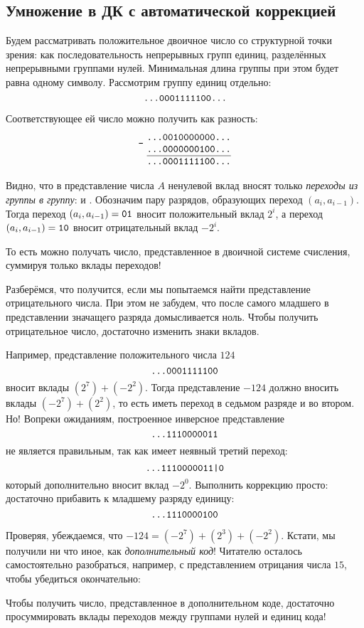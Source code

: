 \subsection{Умножение в ДК с автоматической коррекцией} 

Будем рассматривать положительное двоичное число со структурной точки зрения: как последовательность непрерывных групп единиц, разделённых непрерывными группами нулей. Минимальная длина группы при этом будет равна одному символу. Рассмотрим группу единиц отдельно:
\[
    \texttt{...0001111100...}
\]

Соответствующее ей число можно получить как разность:
\[
    \Subtraction{...0010000000...}
                {...0000000100...}
                {...0001111100...}
\]

Видно, что в представление числа $A$ ненулевой вклад вносят только \emph{переходы из группы в группу}:  и . Обозначим пару разрядов, образующих переход $(a_i,a_{i-1})$. Тогда переход $(a_i,a_{i-1})=\texttt{01}$ вносит положительный вклад $2^i$, а переход $(a_i,a_{i-1})=\texttt{10}$ вносит отрицательный вклад ${-2^i}$.

То есть можно получать число, представленное в двоичной системе счисления, суммируя только вклады переходов!

Разберёмся, что получится, если мы попытаемся найти представление отрицательного числа. При этом не забудем, что после самого младшего в представлении значащего разряда домысливается ноль. Чтобы получить отрицательное число, достаточно изменить знаки вкладов. 

Например, представление положительного числа $124$ 
\[
    \texttt{...0001111100}
\] 
вносит вклады $(2^7) + (-2^2)$. Тогда представление $-124$ должно вносить вклады $(-2^7) + (2^2)$, то есть иметь переход  в седьмом разряде и  во втором. Но! Вопреки ожиданиям, построенное инверсное представление
\[
    \texttt{...1110000011}
\]
не является правильным, так как имеет неявный третий переход:
\[
    \texttt{...1110000011|0}
\]
который дополнительно вносит вклад $-2^0$. Выполнить коррекцию просто: достаточно прибавить к младшему разряду единицу:
\[
    \texttt{...1110000100}
\]

Проверяя, убеждаемся, что $-124 = (-2^7) + (2^3) + (-2^2)$. Кстати, мы получили ни что иное, как \emph{дополнительный код}! Читателю осталось  самостоятельно разобраться, например, с представлением отрицания числа $15$, чтобы убедиться окончательно: 
\begin{Theorem}
    Чтобы получить число, представленное в дополнительном коде, достаточно просуммировать вклады переходов между группами нулей и единиц кода!
\end{Theorem}

